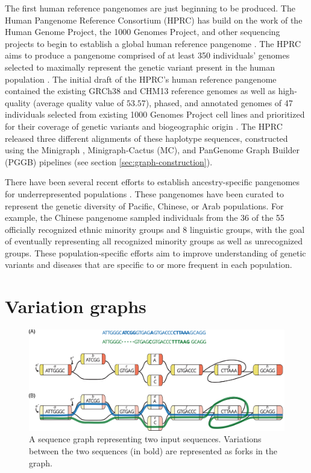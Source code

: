 \documentclass[11pt]{ucscthesis}
\begin{document}
The first human reference pangenomes are just beginning to be produced.
The Human Pangenome Reference Consortium (HPRC) has build on the work of the Human Genome Project, the 1000 Genomes Project, and other sequencing projects to begin to establish a global human reference pangenome \cite{hprc_2022}.
The HPRC aims to produce a pangenome comprised of at least 350 individuals' genomes selected to maximally represent the genetic variant present in the human population \cite{hprc_2022}.
The initial draft of the HPRC's human reference pangenome contained the existing GRCh38 and CHM13 reference genomes as well as high-quality (average quality value of $53.57$), phased, and annotated genomes of 47 individuals selected from existing 1000 Genomes Project cell lines and prioritized for their coverage of genetic variants and biogeographic origin \cite{hprc_draft_2023}.
The HPRC released three different alignments of these haplotype sequences, constructed using the Minigraph \cite{li_minigraph_2020}, Minigraph-Cactus (MC)\cite{minigraph_cactus_2024}, and PanGenome Graph Builder (PGGB) \cite{pggb_2024} pipelines (see section \ref{sec:graph-construction}). 


There have been several recent efforts to establish ancestry-specific pangenomes for underrepresented populations \cite{pacific_pangenome_2024,chinese_pangenome_2023,arab_pangenome_2024}.
These pangenomes have been curated to represent the genetic diversity of Pacific, Chinese, or Arab populations.
For example, the Chinese pangenome sampled individuals from the 36 of the 55 officially recognized ethnic minority groups and 8 linguistic groups, with the goal of eventually representing all recognized minority groups as well as unrecognized groups\cite{chinese_pangenome_2023}.
These population-specific efforts aim to improve understanding of genetic variants and diseases that are specific to or more frequent in each population.


\section{Variation graphs}
\begin{figure}
    \centering
    \includegraphics[width=\columnwidth]{example_graph.pdf}
    \caption{A sequence graph representing two input sequences. Variations between the two sequences (in bold) are represented as forks in the graph.}
    \label{fig:example_graph}
\end{figure}
\end{document}
